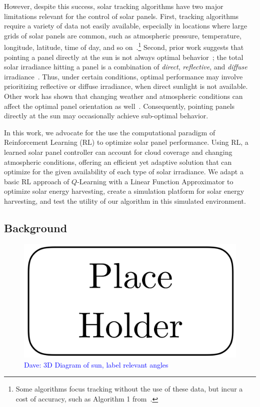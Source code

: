 \documentclass[11pt]{article}
\newcommand{\dnote}[1]{\textcolor{blue}{Dave: #1}}
\begin{document}
However, despite this success, solar tracking algorithms have two major limitations relevant for the control of solar panels. First, tracking algorithms require a variety of data not easily available, especially in locations where large grids of solar panels are common, such as atmospheric pressure, temperature, longitude, latitude, time of day, and so on~\cite{Grena2012}.\footnote{Some algorithms focus tracking without the use of these data, but incur a cost of accuracy, such as Algorithm 1 from~\citet{Grena2012}.} Second, prior work suggests that pointing a panel directly at the sun is not always optimal behavior~\citet{Kelly2009,Hussein1995,King2001}; the total solar irradiance hitting a panel is a combination of {\it direct}, {\it reflective}, and {\it diffuse} irradiance~\cite{Benghanem2011}. Thus, under certain conditions, optimal performance may involve prioritizing reflective or diffuse irradiance, when direct sunlight is not available. Other work has shown that changing weather and atmospheric conditions can affect the optimal panel orientation as well~\cite{Kelly2009,Hussein1995}. Consequently, pointing panels directly at the sun may  occasionally achieve sub-optimal behavior.

In this work, we advocate for the use the computational paradigm of Reinforcement Learning (RL) to optimize solar panel performance. Using RL, a learned solar panel controller can account for cloud coverage and changing atmospheric conditions, offering an efficient yet adaptive solution that can optimize for the given availability of each type of solar irradiance. We adapt a basic RL approach of $Q$-Learning with a Linear Function Approximator to optimize solar energy harvesting, create a simulation platform for solar energy harvesting, and test the utility of our algorithm in this simulated environment.


\subsection{Background}

\begin{figure}
\begin{center}
\includegraphics[scale=0.3]{figures/placeholder.png}
\caption{\dnote{3D Diagram of sun, label relevant angles}}
\end{center}
\end{figure}
\end{document}
